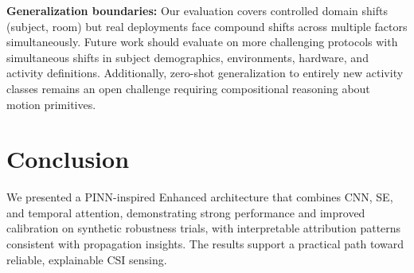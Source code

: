 \documentclass[journal]{IEEEtran}
\begin{document}
\textbf{Generalization boundaries:} Our evaluation covers controlled domain shifts (subject, room) but real deployments face compound shifts across multiple factors simultaneously. Future work should evaluate on more challenging protocols with simultaneous shifts in subject demographics, environments, hardware, and activity definitions. Additionally, zero-shot generalization to entirely new activity classes remains an open challenge requiring compositional reasoning about motion primitives.

\section{Conclusion}
We presented a PINN-inspired Enhanced architecture that combines CNN, SE, and temporal attention, demonstrating strong performance and improved calibration on synthetic robustness trials, with interpretable attribution patterns consistent with propagation insights. The results support a practical path toward reliable, explainable CSI sensing.



\end{document}
